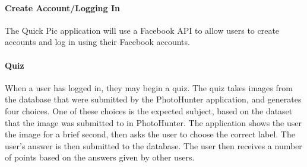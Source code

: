 \documentclass{article}
\begin{document}
\paragraph{Create Account/Logging In}
The Quick Pic application will use a Facebook API to allow users to create
accounts and log in using their Facebook accounts.

\paragraph{Quiz}
When a user has logged in, they may begin a quiz. The quiz takes images from
the database that were submitted by the PhotoHunter application, and generates
four choices. One of these choices is the expected subject, based on the
dataset that the image was submitted to in PhotoHunter. The application shows
the user the image for a brief second, then asks the user to choose the correct
label. The user's answer is then submitted to the database. The user then
receives a number of points based on the answers given by other users.
\end{document}
